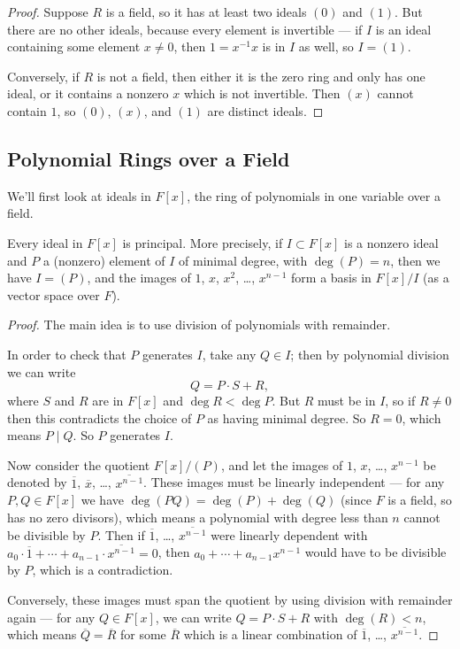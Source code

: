 \begin{proof}
    Suppose $R$ is a field, so it has at least two ideals $(0)$ and $(1)$. But there are no other ideals, because every element is invertible --- if $I$ is an ideal containing some element $x \neq 0$, then $1 = x^{-1}x$ is in $I$ as well, so $I = (1)$. 

    Conversely, if $R$ is not a field, then either it is the zero ring and only has one ideal, or it contains a nonzero $x$ which is not invertible. Then $(x)$ cannot contain $1$, so $(0)$, $(x)$, and $(1)$ are distinct ideals. 
\end{proof}

\subsection{Polynomial Rings over a Field}

We'll first look at ideals in $F[x]$, the ring of polynomials in one variable over a field. 

\begin{proposition} \label{F[x] is a PID}
    Every ideal in $F[x]$ is principal. More precisely, if $I \subset F[x]$ is a nonzero ideal and $P$ a (nonzero) element of $I$ of minimal degree, with $\deg(P) = n$, then we have $I = (P)$, and the images of $1$, $x$, $x^2$, \ldots, $x^{n - 1}$ form a basis in $F[x]/I$ (as a vector space over $F$). 
\end{proposition}

\begin{proof}
    The main idea is to use division of polynomials with remainder. 
    
    In order to check that $P$ generates $I$, take any $Q \in I$; then by polynomial division we can write \[Q = P\cdot S + R,\] where $S$ and $R$ are in $F[x]$ and $\deg R < \deg P$. But $R$ must be in $I$, so if $R \neq 0$ then this contradicts the choice of $P$ as having minimal degree. So $R = 0$, which means $P \mid Q$. So $P$ generates $I$. 
    
    Now consider the quotient $F[x]/(P)$, and let the images of $1$, $x$, \ldots, $x^{n - 1}$ be denoted by $\overline{1}$, $\overline{x}$, \ldots, $\overline{x^{n - 1}}$. These images must be linearly independent --- for any $P, Q \in F[x]$ we have $\deg(PQ) = \deg(P) + \deg(Q)$ (since $F$ is a field, so has no zero divisors), which means a polynomial with degree less than $n$ cannot be divisible by $P$. Then if $\overline{1}$, \ldots, $\overline{x^{n - 1}}$ were linearly dependent with $a_0\cdot \overline{1} + \cdots + a_{n - 1}\cdot \overline{x^{n - 1}} = 0$, then $a_0 + \cdots + a_{n - 1}x^{n - 1}$ would have to be divisible by $P$, which is a contradiction. 
    
    Conversely, these images must span the quotient by using division with remainder again --- for any $Q \in F[x]$, we can write $Q = P \cdot S + R$ with $\deg(R) < n$, which means $\overline{Q} = \overline{R}$ for some $\overline{R}$ which is a linear combination of $\overline{1}$, \ldots, $\overline{x^{n - 1}}$.
\end{proof}

